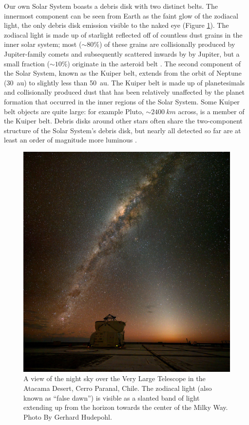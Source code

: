 \documentclass[12pt,oneside]{book}
\begin{document}
Our own Solar System boasts a debris disk with two distinct belts.
The innermost component can be seen from Earth as the faint glow of the zodiacal light, the only debris disk emission visible to the naked eye (Figure \ref{fig: zodiacal}). 
The zodiacal light is made up of starlight reflected off of countless dust grains in the inner solar system; most ($\sim 80\%$) of these grains are collisionally produced by Jupiter-family comets and subsequently scattered inwards by by Jupiter, but a small fraction ($\sim 10\%$) originate in the asteroid belt \citep{nesvorny10,wyatt2008}.
The second component of the Solar System, known as the Kuiper belt, extends from the orbit of Neptune (\SI{30}{au}) to slightly less than \SI{50}{au}.
The Kuiper belt is made up of planetesimals and collisionally produced dust that has been relatively unaffected by the planet formation that occurred in the inner regions of the Solar System.
Some Kuiper belt objects are quite large: for example Pluto, $\sim \SI{2400}{km}$ across, is a member of the Kuiper belt.
Debris disks around other stars often share the two-component structure of the Solar System's debris disk, but nearly all detected so far are at least an order of magnitude more luminous \citep{matthews14}.

\begin{figure}
  \includegraphics[width=\textwidth]{../figures/zodiacal_light}
  \caption{
  A view of the night sky over the Very Large Telescope in the Atacama Desert, Cerro Paranal, Chile. 
  The zodiacal light (also known as ``false dawn'') is visible as a slanted band of light extending up from the horizon towards the center of the Milky Way.
  Photo By Gerhard Hudepohl.}
  \label{fig: zodiacal}
\end{figure}
\end{document}
